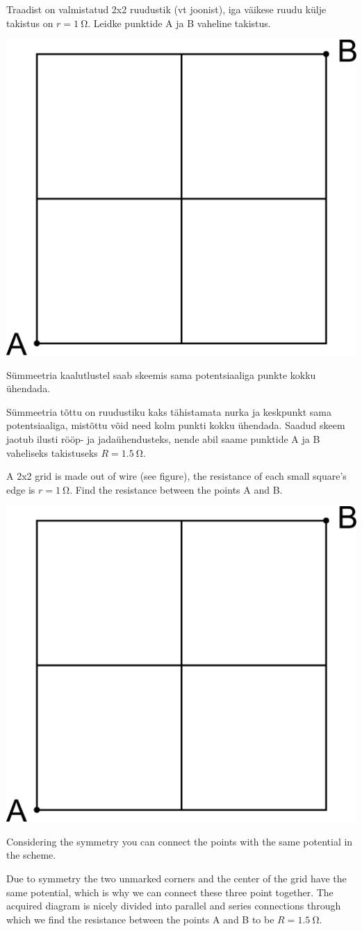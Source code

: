 
Traadist on valmistatud 2x2 ruudustik (vt joonist), iga väikese ruudu külje takistus on $r=\SI{1}{\ohm}$. Leidke punktide A ja B vaheline takistus.

\begin{center}
\includegraphics[width=0.2\linewidth]{2014-v3g-01-ruudustik}
\end{center}

\hint
Sümmeetria kaalutlustel saab skeemis sama potentsiaaliga punkte kokku ühendada.

\solu
Sümmeetria tõttu on ruudustiku kaks tähistamata nurka ja keskpunkt sama potentsiaaliga, mistõttu võid need kolm punkti kokku ühendada. Saadud skeem jaotub ilusti rööp- ja jadaühendusteks, nende abil saame punktide A ja B vaheliseks takistuseks $R=\SI{1,5}{\ohm}$.

A 2x2 grid is made out of wire (see figure), the resistance of each small square’s edge is $r=\SI{1}{\ohm}$. Find the resistance between the points A and B. 
\begin{center}
\includegraphics[width=0.2\linewidth]{2014-v3g-01-ruudustik}
\end{center}

\hinteng
Considering the symmetry you can connect the points with the same potential in the scheme.

\solueng
Due to symmetry the two unmarked corners and the center of the grid have the same potential, which is why we can connect these three point together. The acquired diagram is nicely divided into parallel and series connections through which we find the resistance between the points A and B to be $R=\SI{1,5}{\ohm}$.
\probend